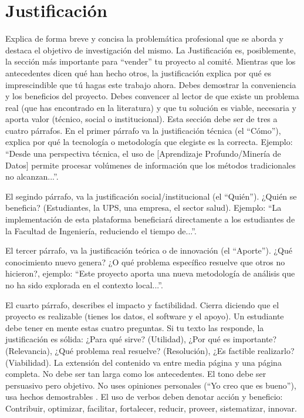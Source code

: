 \documentclass[12pt]{article}
\begin{document}
\section{Justificación}
{\color{magenta}Explica de forma breve y concisa la problemática profesional que se aborda y destaca el objetivo de investigación del mismo.}
La Justificación es, posiblemente, la sección más importante para ``vender'' tu proyecto al comité. Mientras que los antecedentes dicen qué han hecho otros, la justificación explica por qué es imprescindible que tú hagas este trabajo ahora.
Debes demostrar la conveniencia y los beneficios del proyecto. Debes convencer al lector de que existe un problema real (que has encontrado en la literatura) y que tu solución es viable, necesaria y aporta valor (técnico, social o institucional). Esta sección debe ser de tres a cuatro párrafos.
En el primer párrafo va la justificación técnica (el ``Cómo''), explica por qué la tecnología o metodología que elegiste es la correcta.
Ejemplo: ``Desde una perspectiva técnica, el uso de [Aprendizaje Profundo/Minería de Datos] permite procesar volúmenes de información que los métodos tradicionales no alcanzan...''.

El segindo párrafo, va la justificación social/institucional (el ``Quién''). ¿Quién se beneficia? (Estudiantes, la UPS, una empresa, el sector salud). Ejemplo: ``La implementación de esta plataforma beneficiará directamente a los estudiantes de la Facultad de Ingeniería, reduciendo el tiempo de...''.

El tercer párrafo, va la justificación teórica o de innovación (el ``Aporte''). ¿Qué conocimiento nuevo genera? ¿O qué problema específico resuelve que otros no hicieron?, ejemplo: ``Este proyecto aporta una nueva metodología de análisis que no ha sido explorada en el contexto local...''.

El cuarto párrafo, describes el impacto y factibilidad. Cierra diciendo que el proyecto es realizable (tienes los datos, el software y el apoyo). Un estudiante debe tener en mente estas cuatro preguntas. Si tu texto las responde, la justificación es sólida: ¿Para qué sirve? (Utilidad), ¿Por qué es importante? (Relevancia), ¿Qué problema real resuelve? (Resolución), ¿Es factible realizarlo? (Viabilidad).
La extensión del contenido va entre media página y una página completa. No debe ser tan larga como los antecedentes. El tono debe ser persuasivo pero objetivo. No uses opiniones personales (``Yo creo que es bueno''), usa hechos demostrables .
El uso de verbos deben denotar acción y beneficio:
Contribuir, optimizar, facilitar, fortalecer, reducir, proveer, sistematizar, innovar.
\end{document}

